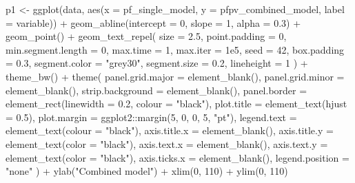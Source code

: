 \documentclass[
  11pt,
  oneside]{book}
\newenvironment{Shaded}{\begin{snugshade}}{\end{snugshade}}
\newcommand{\AttributeTok}[1]{\textcolor[rgb]{0.77,0.63,0.00}{#1}}
\newcommand{\DecValTok}[1]{\textcolor[rgb]{0.00,0.00,0.81}{#1}}
\newcommand{\FloatTok}[1]{\textcolor[rgb]{0.00,0.00,0.81}{#1}}
\newcommand{\FunctionTok}[1]{\textcolor[rgb]{0.00,0.00,0.00}{#1}}
\newcommand{\NormalTok}[1]{#1}
\newcommand{\OtherTok}[1]{\textcolor[rgb]{0.56,0.35,0.01}{#1}}
\newcommand{\SpecialCharTok}[1]{\textcolor[rgb]{0.00,0.00,0.00}{#1}}
\newcommand{\StringTok}[1]{\textcolor[rgb]{0.31,0.60,0.02}{#1}}
\begin{document}
\begin{Shaded}
\begin{Highlighting}[]
\NormalTok{p1 }\OtherTok{\textless{}{-}} \FunctionTok{ggplot}\NormalTok{(data, }\FunctionTok{aes}\NormalTok{(}\AttributeTok{x =}\NormalTok{ pf\_single\_model, }\AttributeTok{y =}\NormalTok{ pfpv\_combined\_model, }\AttributeTok{label =}\NormalTok{ variable)) }\SpecialCharTok{+}
  \FunctionTok{geom\_abline}\NormalTok{(}\AttributeTok{intercept =} \DecValTok{0}\NormalTok{, }\AttributeTok{slope =} \DecValTok{1}\NormalTok{, }\AttributeTok{alpha =} \FloatTok{0.3}\NormalTok{) }\SpecialCharTok{+}
  \FunctionTok{geom\_point}\NormalTok{() }\SpecialCharTok{+}
  \FunctionTok{geom\_text\_repel}\NormalTok{(}
    \AttributeTok{size =} \FloatTok{2.5}\NormalTok{, }\AttributeTok{point.padding =} \DecValTok{0}\NormalTok{, }\AttributeTok{min.segment.length =} \DecValTok{0}\NormalTok{,}
    \AttributeTok{max.time =} \DecValTok{1}\NormalTok{, }\AttributeTok{max.iter =} \FloatTok{1e5}\NormalTok{, }\AttributeTok{seed =} \DecValTok{42}\NormalTok{, }\AttributeTok{box.padding =} \FloatTok{0.3}\NormalTok{,}
    \AttributeTok{segment.color =} \StringTok{"grey30"}\NormalTok{, }\AttributeTok{segment.size =} \FloatTok{0.2}\NormalTok{, }\AttributeTok{lineheight =} \DecValTok{1}
\NormalTok{  ) }\SpecialCharTok{+}
  \FunctionTok{theme\_bw}\NormalTok{() }\SpecialCharTok{+}
  \FunctionTok{theme}\NormalTok{(}
    \AttributeTok{panel.grid.major =} \FunctionTok{element\_blank}\NormalTok{(),}
    \AttributeTok{panel.grid.minor =} \FunctionTok{element\_blank}\NormalTok{(),}
    \AttributeTok{strip.background =} \FunctionTok{element\_blank}\NormalTok{(),}
    \AttributeTok{panel.border =} \FunctionTok{element\_rect}\NormalTok{(}\AttributeTok{linewidth =} \FloatTok{0.2}\NormalTok{, }\AttributeTok{colour =} \StringTok{"black"}\NormalTok{),}
    \AttributeTok{plot.title =} \FunctionTok{element\_text}\NormalTok{(}\AttributeTok{hjust =} \FloatTok{0.5}\NormalTok{),}
    \AttributeTok{plot.margin =}\NormalTok{ ggplot2}\SpecialCharTok{::}\FunctionTok{margin}\NormalTok{(}\DecValTok{5}\NormalTok{, }\DecValTok{0}\NormalTok{, }\DecValTok{0}\NormalTok{, }\DecValTok{5}\NormalTok{, }\StringTok{"pt"}\NormalTok{),}
    \AttributeTok{legend.text =} \FunctionTok{element\_text}\NormalTok{(}\AttributeTok{colour =} \StringTok{"black"}\NormalTok{),}
    \AttributeTok{axis.title.x =} \FunctionTok{element\_blank}\NormalTok{(),}
    \AttributeTok{axis.title.y =} \FunctionTok{element\_text}\NormalTok{(}\AttributeTok{color =} \StringTok{"black"}\NormalTok{),}
    \AttributeTok{axis.text.x =} \FunctionTok{element\_blank}\NormalTok{(),}
    \AttributeTok{axis.text.y =} \FunctionTok{element\_text}\NormalTok{(}\AttributeTok{color =} \StringTok{"black"}\NormalTok{),}
    \AttributeTok{axis.ticks.x =} \FunctionTok{element\_blank}\NormalTok{(),}
    \AttributeTok{legend.position =} \StringTok{"none"}
\NormalTok{  ) }\SpecialCharTok{+}
  \FunctionTok{ylab}\NormalTok{(}\StringTok{"Combined model"}\NormalTok{) }\SpecialCharTok{+}
  \FunctionTok{xlim}\NormalTok{(}\DecValTok{0}\NormalTok{, }\DecValTok{110}\NormalTok{) }\SpecialCharTok{+}
  \FunctionTok{ylim}\NormalTok{(}\DecValTok{0}\NormalTok{, }\DecValTok{110}\NormalTok{)}


\end{Highlighting}
\end{Shaded}
\end{document}
